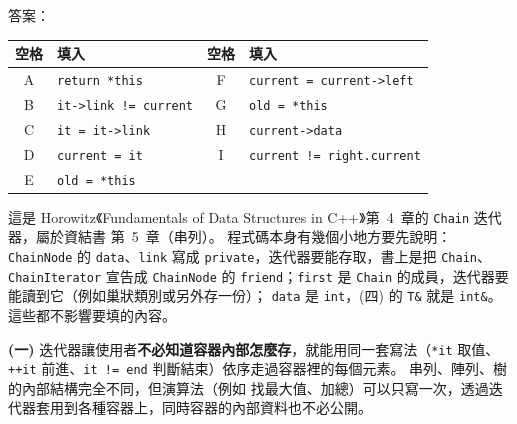 \begin{pastsoln}
答案：
\begin{center}
\begin{tabular}{cl@{\qquad}cl}
\toprule
空格 & 填入 & 空格 & 填入 \\
\midrule
A & \texttt{return *this} & F & \texttt{current = current->left} \\
B & \texttt{it->link != current} & G & \texttt{old = *this} \\
C & \texttt{it = it->link} & H & \texttt{current->data} \\
D & \texttt{current = it} & I & \texttt{current != right.current} \\
E & \texttt{old = *this} & & \\
\bottomrule
\end{tabular}
\end{center}
這是 Horowitz《Fundamentals of Data Structures in C++》第~4~章的 \texttt{Chain} 迭代器，屬於資結書
第~5~章（串列）。 程式碼本身有幾個小地方要先說明：\texttt{ChainNode} 的 \texttt{data}、\texttt{link} 寫成
\texttt{private}，迭代器要能存取，書上是把 \texttt{Chain}、\texttt{ChainIterator} 宣告成 \texttt{ChainNode} 的
\texttt{friend}；\texttt{first} 是 \texttt{Chain} 的成員，迭代器要能讀到它（例如巢狀類別或另外存一份）；
\texttt{data} 是 \texttt{int}，(四) 的 \texttt{T\&} 就是 \texttt{int\&}。 這些都不影響要填的內容。

\textbf{(一)} 迭代器讓使用者\textbf{不必知道容器內部怎麼存}，就能用同一套寫法（\texttt{*it} 取值、\texttt{++it}
前進、\texttt{it != end} 判斷結束）依序走過容器裡的每個元素。 串列、陣列、樹的內部結構完全不同，但演算法（例如
找最大值、加總）可以只寫一次，透過迭代器套用到各種容器上，同時容器的內部資料也不必公開。


\end{pastsoln}
